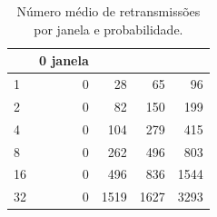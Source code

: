 \begin{table}
\caption{Número médio de retransmissões por janela e probabilidade.}
\label{tab:retrans}
\begin{tabular}{lrrrr}
\toprule
 & 0%
janela &  &  &  &  \\
\midrule
1 & 0 & 28 & 65 & 96 \\
2 & 0 & 82 & 150 & 199 \\
4 & 0 & 104 & 279 & 415 \\
8 & 0 & 262 & 496 & 803 \\
16 & 0 & 496 & 836 & 1544 \\
32 & 0 & 1519 & 1627 & 3293 \\
\bottomrule
\end{tabular}
\end{table}

